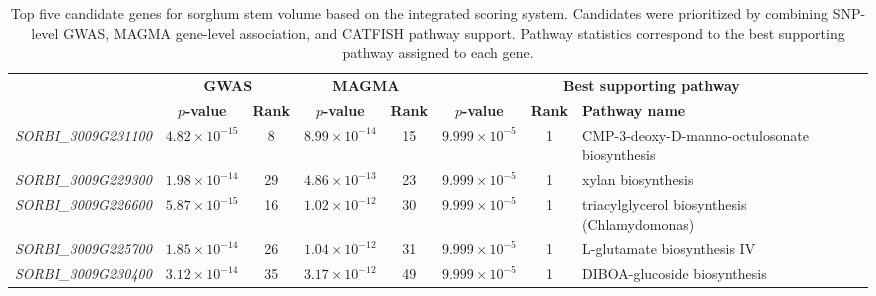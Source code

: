 \documentclass[unnumsec,webpdf,contemporary,large]{oup-authoring-template}%
\theoremstyle{thmstyleone}%
\theoremstyle{thmstyletwo}%
\theoremstyle{thmstylethree}%
\begin{document}
\begin{table}[!tp]
\centering
\caption{Top five candidate genes for sorghum stem volume based on the integrated scoring system. Candidates were prioritized by combining SNP-level GWAS, MAGMA gene-level association, and CATFISH pathway support. Pathway statistics correspond to the best supporting pathway assigned to each gene.}
\label{tab:sap_stem_volume_top5_candidates}
\small
\setlength{\tabcolsep}{5pt}
\renewcommand{\arraystretch}{1.15}

\begin{tabularx}{\linewidth}{
>{\raggedright\arraybackslash}p{4.0cm}
cc
cc
cc
>{\raggedright\arraybackslash}X
}
\toprule
\multirow{2}{*}{\textbf{Gene}} 
& \multicolumn{2}{c}{\textbf{GWAS}} 
& \multicolumn{2}{c}{\textbf{MAGMA}} 
& \multicolumn{3}{c}{\textbf{Best supporting pathway}} \\
\cmidrule(lr){2-3} \cmidrule(lr){4-5} \cmidrule(lr){6-8}
& \textbf{$p$-value} & \textbf{Rank} 
& \textbf{$p$-value} & \textbf{Rank} 
& \textbf{$p$-value} & \textbf{Rank} & \textbf{Pathway name} \\
\midrule

\textit{SORBI\_3009G231100} 
& $4.82 \times 10^{-15}$ & 8  
& $8.99 \times 10^{-14}$ & 15 
& $9.999 \times 10^{-5}$ & 1 
& CMP-3-deoxy-D-manno-octulosonate biosynthesis \\

\textit{SORBI\_3009G229300} 
& $1.98 \times 10^{-14}$ & 29 
& $4.86 \times 10^{-13}$ & 23 
& $9.999 \times 10^{-5}$ & 1 
& xylan biosynthesis \\

\textit{SORBI\_3009G226600} 
& $5.87 \times 10^{-15}$ & 16 
& $1.02 \times 10^{-12}$ & 30 
& $9.999 \times 10^{-5}$ & 1 
& triacylglycerol biosynthesis (Chlamydomonas) \\

\textit{SORBI\_3009G225700} 
& $1.85 \times 10^{-14}$ & 26 
& $1.04 \times 10^{-12}$ & 31 
& $9.999 \times 10^{-5}$ & 1 
& L-glutamate biosynthesis IV \\

\textit{SORBI\_3009G230400} 
& $3.12 \times 10^{-14}$ & 35 
& $3.17 \times 10^{-12}$ & 49 
& $9.999 \times 10^{-5}$ & 1 
& DIBOA-glucoside biosynthesis \\

\bottomrule
\end{tabularx}
\end{table}
\end{document}
